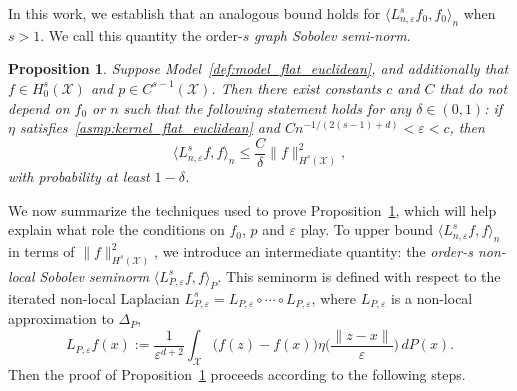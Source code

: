 \documentclass{article}
\newcommand{\1}{\mathbf{1}}
\newcommand{\mc}[1]{\mathcal{#1}}
\newcommand{\dotp}[2]{\langle #1, #2 \rangle}
\theoremstyle{alden}
\theoremstyle{aldenthm}
\newtheorem{proposition}{Proposition}
\theoremstyle{definition}
\theoremstyle{remark}
\begin{document}
In this work, we establish that an analogous bound holds for $\dotp{L_{n,\varepsilon}^sf_0}{f_0}_n$ when $s > 1$. We call this quantity the order-$s$ \emph{graph Sobolev semi-norm}.
\begin{proposition}
	\label{prop:graph_seminorm_ho} 
	Suppose Model~\ref{def:model_flat_euclidean}, and additionally that $f \in H_0^s(\mc{X})$ and $p \in C^{s - 1}(\mc{X})$. Then there exist constants $c$ and $C$ that do not depend on $f_0$ or $n$ such that the following statement holds for any $\delta \in (0,1)$: if $\eta$ satisfies~\ref{asmp:kernel_flat_euclidean} and $Cn^{-1/(2(s - 1) + d)} < \varepsilon < c$, then
	\begin{equation}
	\label{eqn:graph_seminorm_ho}
	\dotp{L_{n,\varepsilon}^s f}{f}_n \leq \frac{C}{\delta} \|f\|_{H^s(\mc{X})}^2 ,
	\end{equation}
	with probability at least $1 - \delta$.
\end{proposition}
We now summarize the techniques used to prove Proposition~\ref{prop:graph_seminorm_ho}, which will help explain what role the conditions on $f_0$, $p$ and $\varepsilon$ play. To upper bound $\dotp{L_{n,\varepsilon}^sf}{f}_n$ in terms of $\|f\|_{H^s(\mc{X})}^2$, we introduce an intermediate quantity: the \emph{order-s non-local Sobolev seminorm} $\dotp{L_{P,\varepsilon}^sf}{f}_{P}$. This seminorm is defined with respect to the iterated non-local Laplacian $L_{P,\varepsilon}^s = L_{P,\varepsilon} \circ \cdots \circ L_{P,\varepsilon}$, where $L_{P,\varepsilon}$ is a non-local approximation to $\Delta_P$, 
\begin{equation}
\label{eqn:nonlocal_laplacian}
L_{P,\varepsilon}f(x) := \frac{1}{\varepsilon^{d + 2}}\int_{\mc{X}}\bigl(f(z) - f(x)\bigr) \eta\biggl(\frac{\|z - x\|}{\varepsilon}\biggr) \,dP(x).
\end{equation}
Then the proof of Proposition~\ref{prop:graph_seminorm_ho} proceeds according to the following steps.
\end{document}
